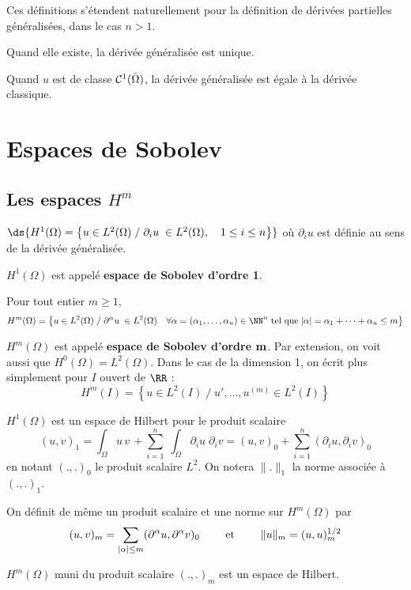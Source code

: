 %
Ces d\'efinitions s'\'etendent naturellement pour la d\'efinition de d\'eriv\'ees partielles g\'en\'eralis\'ees, dans le cas $n>1$.

%
\begin{theorem}
  Quand elle existe, la d\'eriv\'ee g\'en\'eralis\'ee est unique.\label{thr:5}
\end{theorem}

\begin{theorem}
  Quand $u$ est de classe ${\cal C}^1(\bar{\Omega})$, la d\'eriv\'ee
  g\'en\'eralis\'ee est \'egale \`a la d\'eriv\'ee classique.\label{thr:6}
\end{theorem}


%
%
%
%
\section{Espaces de Sobolev}
%
%
\subsection{Les espaces $H^m$}
\label{sec:sobolev}
\noindent

\begin{definition}
  $\ds{ H^1(\Omega) = \left\{ u \in L^2(\Omega)\; / \; \partial_i u \; \in
    L^2(\Omega), \quad 1 \le i \le n \right\} }$ o\`u $\partial_i u$ est
  d\'efinie au sens de la d\'eriv\'ee g\'en\'eralis\'ee.\label{def:14}
\end{definition}
%
$H^1(\Omega)$ est appel\'e {\bf espace de Sobolev d'ordre 1}.
%
\begin{definition}
  Pour tout entier $m\ge 1$,
$$
H^m(\Omega) = \left\{ u \in L^2(\Omega) \; / \; \partial^\alpha u \; \in
  L^2(\Omega) \quad \forall \alpha =(\alpha_1,\ldots,\alpha_n) \in \NN^n\hbox{
  tel que}\; |\alpha|= \alpha_1+\cdots+\alpha_n \le m \right\} $$\label{def:15}
\end{definition}
%
$H^m(\Omega)$ est appel\'e {\bf espace de Sobolev d'ordre $\bf m$}.
%
Par extension, on voit aussi que $H^0(\Omega)=L^2(\Omega)$.
Dans le cas de la dimension 1, on \'ecrit plus simplement pour $I$ ouvert de $\RR$ :
$$ H^m(I) =  \left\{ u \in L^2(I)  \; / \;   u', \ldots, u^{(m)} \in L^2(I) \right\} $$

%
\begin{theorem}
  $H^1(\Omega)$ est un espace de Hilbert pour le produit scalaire
$$
(u,v)_1 = \int_\Omega u \, v\, + \sum_{i=1}^n \; \int_\Omega \partial_i u
\; \partial_i v = (u,v)_0 + \sum_{i=1}^n (\partial_i u, \partial_i v )_0
$$
en notant $(.,.)_0$ le produit scalaire $L^2$. On notera $\|.\|_1$ la norme
associ\'ee \`a $(.,.)_1$.\label{thr:7}
\end{theorem}
%
On d\'efinit de m\^eme un produit scalaire et une norme sur $H^m(\Omega)$ par
$$
(u,v)_m =   \sum_{|\alpha| \le m} ( \partial^\alpha u , \partial^\alpha v )_0 \qquad
\hbox{ et }\qquad
\| u \|_m = (u,u)_m^{1/2}
$$
%
\begin{theorem}
  $H^m(\Omega)$ muni du produit scalaire $(.,.)_m$ est un espace de Hilbert.\label{thr:8}
\end{theorem}


